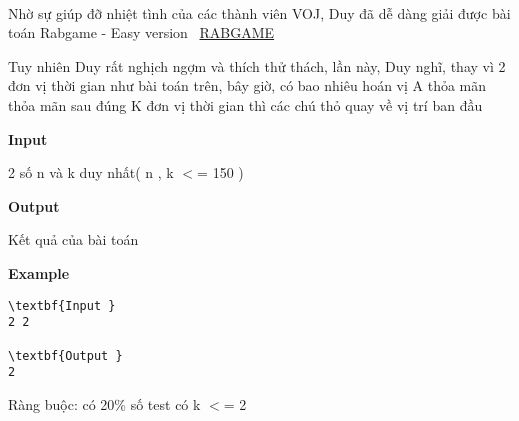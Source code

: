 

 

Nhờ sự giúp đỡ nhiệt tình của các thành viên VOJ, Duy đã dễ dàng giải được bài toán Rabgame - Easy version  \href{http://vnoi.info/problems/show/RABGAME/}{RABGAME}

Tuy nhiên Duy rất nghịch ngợm và thích thử thách, lần này, Duy nghĩ, thay vì 2 đơn vị thời gian như bài toán trên, bây giờ, có bao nhiêu hoán vị A thỏa mãn thỏa mãn sau đúng K đơn vị thời gian thì các chú thỏ quay về vị trí ban đầu

\textbf{Input }

2 số n và k duy nhất( n , k $<$= 150 )

\textbf{Output }

Kết quả của bài toán

\textbf{Example }
\begin{verbatim}
\textbf{Input }
2 2

\textbf{Output }
2\end{verbatim}

Ràng buộc: có 20\% số test có k $<$= 2